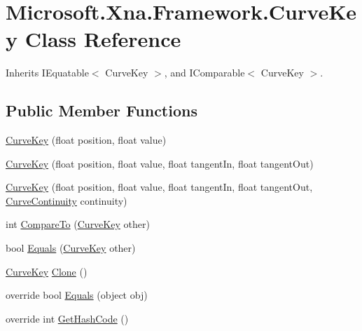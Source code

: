 \hypertarget{class_microsoft_1_1_xna_1_1_framework_1_1_curve_key}{\section{Microsoft.\+Xna.\+Framework.\+Curve\+Key Class Reference}
\label{class_microsoft_1_1_xna_1_1_framework_1_1_curve_key}
}


Inherits I\+Equatable$<$ Curve\+Key $>$, and I\+Comparable$<$ Curve\+Key $>$.

\subsection*{Public Member Functions}
\begin{DoxyCompactItemize}
\item 
\hyperlink{class_microsoft_1_1_xna_1_1_framework_1_1_curve_key_a1647ce6db300eb81762576b419548888}{Curve\+Key} (float position, float value)
\item 
\hyperlink{class_microsoft_1_1_xna_1_1_framework_1_1_curve_key_a45bacba2d6094cdbbe7adcdd783683ed}{Curve\+Key} (float position, float value, float tangent\+In, float tangent\+Out)
\item 
\hyperlink{class_microsoft_1_1_xna_1_1_framework_1_1_curve_key_a89a4084500af0e194fa4255f57576171}{Curve\+Key} (float position, float value, float tangent\+In, float tangent\+Out, \hyperlink{namespace_microsoft_1_1_xna_1_1_framework_aa1e1dcccc97fa3f52759aa5807d9a326}{Curve\+Continuity} continuity)
\item 
int \hyperlink{class_microsoft_1_1_xna_1_1_framework_1_1_curve_key_a6b5c1341ca56904881eede74dd88d81a}{Compare\+To} (\hyperlink{class_microsoft_1_1_xna_1_1_framework_1_1_curve_key}{Curve\+Key} other)
\item 
bool \hyperlink{class_microsoft_1_1_xna_1_1_framework_1_1_curve_key_a62e4ed46e01bd7b41bfa3997245f90d3}{Equals} (\hyperlink{class_microsoft_1_1_xna_1_1_framework_1_1_curve_key}{Curve\+Key} other)
\item 
\hyperlink{class_microsoft_1_1_xna_1_1_framework_1_1_curve_key}{Curve\+Key} \hyperlink{class_microsoft_1_1_xna_1_1_framework_1_1_curve_key_adaa723a8c64729e9e88c47dce9cd9f6d}{Clone} ()
\item 
override bool \hyperlink{class_microsoft_1_1_xna_1_1_framework_1_1_curve_key_a11063af38237c8c86105b74ee904a24f}{Equals} (object obj)
\item 
override int \hyperlink{class_microsoft_1_1_xna_1_1_framework_1_1_curve_key_af2275ae3eab50471d5b0a1b59125f0d4}{Get\+Hash\+Code} ()
\end{DoxyCompactItemize}
